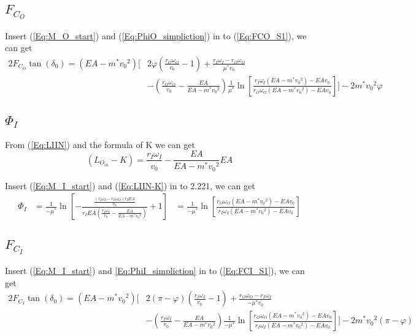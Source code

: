 \documentclass[a4paper,fleqn,13pt]{article}
\begin{document}
\subsection{$F_{C_O}$}
Insert (\ref{Eq:M_O_start}) and (\ref{Eq:PhiO_simpliction}) in to (\ref{Eq:FCO_S1}), we can get
\begin{equation}  \label{Eq:FCO_S2}
  \begin{split}
   2F_{C_O} \tan (\delta_0) =\left(EA-m^*{v_0}^2 \right)  \Bigg[& 2\varphi \left(\frac{r_O\omega_O}{v_0}-1 \right) + \frac{r_I\omega_I-r_O\omega_O}{\mu^*v_0}  \\
							 &  - \left(\frac{r_O\omega_O}{v_0} - \frac{EA}{EA-m^*{v_0}^2}\right)\frac{1}{\mu^*}\ln {\left[\frac{r_I\omega_I(EA-m^*{v_0}^2)-EAv_0}{r_O\omega_O(EA-m^*{v_0}^2)-EAv_0}\right]}\Bigg]  - 2m^*{v_0}^2\varphi
   \end{split}
 \end{equation}



\subsection{$\Phi_I$}
From (\ref{Eq:LIIN}) and the formula of K we can get 
 \begin{equation}  \label{LIIN-K}
  \left(L_{O_{in}} - K \right)  = \frac{r_I \omega_I}{v_0}  - \frac{EA}{EA-m^{*}{v_0}^2} EA
 \end{equation}

Insert (\ref{Eq:M_I_start}) and (\ref{Eq:LIIN-K}) in to 2.221, we can get
\begin{equation} \label{Eq:PhiI_simpliction}
  \begin{aligned}
  \Phi_I  &= \frac{1}{-\mu^*} \ln {\left[-\frac{\frac{(r_I\omega_I-r_O\omega_O)r_I EA}{v_0}}{r_I EA(\frac{r_I\omega_I}{v_0}-\frac{EA}{EA-m^*{v_0}^2})} + 1\right]}
	  &= \frac{1}{-\mu^*} \ln {\left[\frac{r_O\omega_O(EA-m^*{v_0}^2)-EAv_0}{r_I\omega_I(EA-m^*{v_0}^2)-EAv_0}\right]}
  \end{aligned}
\end{equation}


\subsection{$F_{C_I}$}
Insert (\ref{Eq:M_I_start}) and \ref{Eq:PhiI_simpliction} in to (\ref{Eq:FCI_S1}), we can get
\begin{equation} \label{Eq:FCI_S2}
  \begin{split}
    2F_{C_I} \tan (\delta_0)  = \left(EA-m^*{v_0}^2 \right)  \Bigg[& 2(\pi-\varphi) \left(\frac{r_I\omega_I}{v_0}-1 \right) + \frac{r_O\omega_O-r_I\omega_I}{-\mu^*v_0} \\ 
                                                            &  -\left(\frac{r_I\omega_I}{v_0} - \frac{EA}{EA-m^*{v_0}^2}\right)\frac{1}{-\mu^*} \ln {\left[\frac{r_O\omega_O(EA-m^*{v_0}^2)-EAv_0}{r_I\omega_I(EA-m^*{v_0}^2)-EAv_0}\right]}\Bigg]  - 2m^*{v_0}^2(\pi-\varphi)
  \end{split}
\end{equation}
\end{document}
